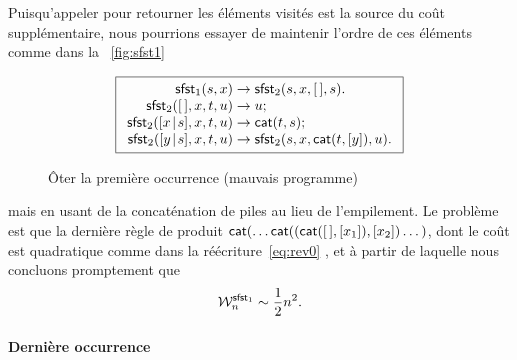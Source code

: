 Puisqu'appeler  pour retourner
les éléments visités est la source du coût supplémentaire, nous
pourrions essayer de maintenir l'ordre de ces éléments comme dans la
\fig~\vref{fig:sfst1}
\begin{figure}
\begin{equation*}
\boxed{%
\begin{array}{r@{\;}l@{\;}l}
\fun{sfst}_1(s,x)               & \rightarrow
                                & \fun{sfst}_2(s,x,\el,s).\\
\fun{sfst}_2(\el,x,t,u)         & \rightarrow & u;\\
\fun{sfst}_2(\cons{x}{s},x,t,u) & \rightarrow & \fun{cat}(t,s);\\
\fun{sfst}_2(\cons{y}{s},x,t,u) & \rightarrow
                                & \fun{sfst}_2(s,x,\fun{cat}(t,[y]),u).
\end{array}}
\end{equation*}
\caption{Ôter la première occurrence (mauvais programme)}
\label{fig:sfst1}
\end{figure}
mais en usant de la concaténation de piles au lieu de l'empilement. Le
problème est que la dernière règle de
 produit
\(\fun{cat}(\dots\fun{cat}((\fun{cat}(\el,[x_1]),[x_2])\dots)\), dont
le coût est quadratique comme dans la
réécriture~\eqref{eq:rev0}
, et à partir de
laquelle nous concluons promptement que
\begin{equation*}
  \W{\fun{sfst}_1}{n} \sim \frac{1}{2}n^2.
\end{equation*}

\paragraph{Dernière occurrence}

